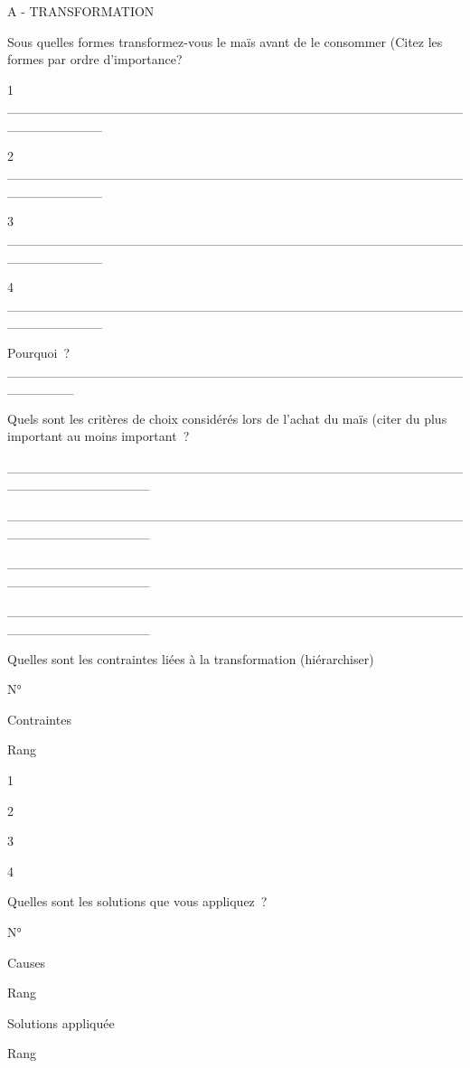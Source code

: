 \documentclass[12pt,oneside]{report}
\begin{document}
A - TRANSFORMATION

Sous quelles formes transformez-vous le maïs avant de le consommer (Citez les formes par ordre d’importance?

1 \_\_\_\_\_\_\_\_\_\_\_\_\_\_\_\_\_\_\_\_\_\_\_\_\_\_\_\_\_\_\_\_\_\_\_\_\_\_\_\_\_\_\_\_\_\_\_\_\_\_\_\_\_\_\_\_\_\_

2 \_\_\_\_\_\_\_\_\_\_\_\_\_\_\_\_\_\_\_\_\_\_\_\_\_\_\_\_\_\_\_\_\_\_\_\_\_\_\_\_\_\_\_\_\_\_\_\_\_\_\_\_\_\_\_\_\_\_

3 \_\_\_\_\_\_\_\_\_\_\_\_\_\_\_\_\_\_\_\_\_\_\_\_\_\_\_\_\_\_\_\_\_\_\_\_\_\_\_\_\_\_\_\_\_\_\_\_\_\_\_\_\_\_\_\_\_\_

4 \_\_\_\_\_\_\_\_\_\_\_\_\_\_\_\_\_\_\_\_\_\_\_\_\_\_\_\_\_\_\_\_\_\_\_\_\_\_\_\_\_\_\_\_\_\_\_\_\_\_\_\_\_\_\_\_\_\_

Pourquoi ? \_\_\_\_\_\_\_\_\_\_\_\_\_\_\_\_\_\_\_\_\_\_\_\_\_\_\_\_\_\_\_\_\_\_\_\_\_\_\_\_\_\_\_\_\_\_\_\_\_\_\_\_\_\_\_

Quels sont les critères de choix considérés lors de l’achat du maïs (citer du plus important au moins important ?

\_\_\_\_\_\_\_\_\_\_\_\_\_\_\_\_\_\_\_\_\_\_\_\_\_\_\_\_\_\_\_\_\_\_\_\_\_\_\_\_\_\_\_\_\_\_\_\_\_\_\_\_\_\_\_\_\_\_\_\_\_\_\_

\_\_\_\_\_\_\_\_\_\_\_\_\_\_\_\_\_\_\_\_\_\_\_\_\_\_\_\_\_\_\_\_\_\_\_\_\_\_\_\_\_\_\_\_\_\_\_\_\_\_\_\_\_\_\_\_\_\_\_\_\_\_\_

\_\_\_\_\_\_\_\_\_\_\_\_\_\_\_\_\_\_\_\_\_\_\_\_\_\_\_\_\_\_\_\_\_\_\_\_\_\_\_\_\_\_\_\_\_\_\_\_\_\_\_\_\_\_\_\_\_\_\_\_\_\_\_

\_\_\_\_\_\_\_\_\_\_\_\_\_\_\_\_\_\_\_\_\_\_\_\_\_\_\_\_\_\_\_\_\_\_\_\_\_\_\_\_\_\_\_\_\_\_\_\_\_\_\_\_\_\_\_\_\_\_\_\_\_\_\_

Quelles sont les contraintes liées à la transformation  (hiérarchiser)

N°

Contraintes

Rang

1

2

3

4

Quelles sont les solutions que vous appliquez ?

N°

Causes

Rang

Solutions appliquée

Rang
\end{document}
